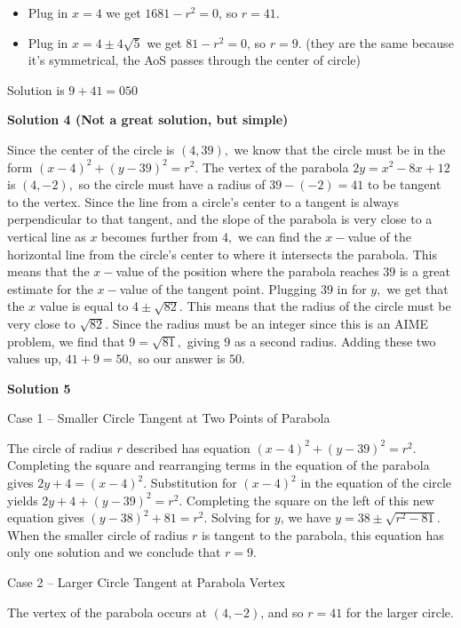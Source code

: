 \begin{enumerate}
 
            \begin{itemize}
        \item Plug in $x=4$ we get $1681-r^2=0$, so $r=41$.
        \item Plug in $x=4\pm 4\sqrt5$ we get $81-r^2=0$, so $r=9$. (they are the same because it's symmetrical, the AoS passes through the center of circle)
            \end{itemize}
            Solution is $9+41=\boxed{050}$




\textbf{Solution 4 (Not a great solution, but simple)}

Since the center of the circle is $(4,39),$ we know that the circle must be in the form $(x-4)^2+(y-39)^2=r^2.$ The vertex of the parabola $2y=x^2-8x+12$ is $(4,-2),$ so the circle must have a radius of $39-(-2)=41$ to be tangent to the vertex. Since the line from a circle's center to a tangent is always perpendicular to that tangent, and the slope of the parabola is very close to a vertical line as $x$ becomes further from $4,$ we can find the $x-$value of the horizontal line from the circle's center to where it intersects the parabola. This means that the $x-$value of the position where the parabola reaches $39$ is a great estimate for the $x-$value of the tangent point. Plugging $39$ in for $y,$ we get that the $x$ value is equal to $4\pm{\sqrt{82}}.$ This means that the radius of the circle must be very close to $\sqrt{82}.$ Since the radius must be an integer since this is an AIME problem, we find that $9=\sqrt{81},$ giving $9$ as a second radius. Adding these two values up, $41+9=50,$ so our answer is $\boxed{50}.$




\textbf{Solution 5}

Case 1 – Smaller Circle Tangent at Two Points of Parabola

 The circle of radius $r$ described has equation $(x-4)^2+(y-39)^2=r^2$. Completing the square and rearranging terms in the equation of the parabola gives $2y+4=(x-4)^2$. Substitution for $(x-4)^2$ in the equation of the circle yields $2y+4+(y-39)^2=r^2$. Completing the square on the left of this new equation gives $(y-38)^2+81=r^2$. Solving for $y$, we have $y=38 \pm \sqrt{r^2-81}$. When the smaller circle of radius $r$ is tangent to the parabola, this equation has only one solution and we conclude that $r=9$.

 
Case 2 – Larger Circle Tangent at Parabola Vertex

 The vertex of the parabola occurs at $(4,-2)$, and so $r=41$ for the larger circle.


\end{enumerate}
